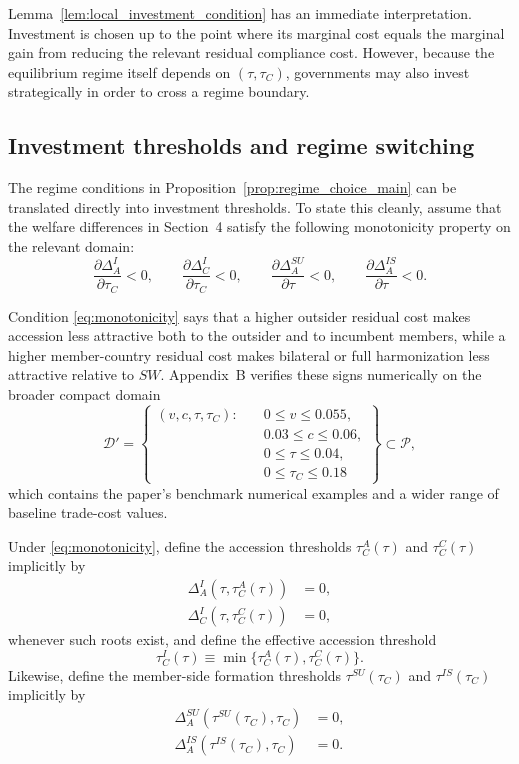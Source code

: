 Lemma~\ref{lem:local_investment_condition} has an immediate interpretation.
Investment is chosen up to the point where its marginal cost equals the
marginal gain from reducing the relevant residual compliance cost. However,
because the equilibrium regime itself depends on $(\tau,\tau_C)$, governments
may also invest strategically in order to cross a regime boundary.

\subsection{Investment thresholds and regime switching}

The regime conditions in Proposition~\ref{prop:regime_choice_main} can be
translated directly into investment thresholds. To state this cleanly, assume
that the welfare differences in Section~4 satisfy the following monotonicity
property on the relevant domain:
\begin{equation}
\frac{\partial \Delta_A^I}{\partial \tau_C}<0,
\qquad
\frac{\partial \Delta_C^I}{\partial \tau_C}<0,
\qquad
\frac{\partial \Delta_A^{SU}}{\partial \tau}<0,
\qquad
\frac{\partial \Delta_A^{IS}}{\partial \tau}<0.
\label{eq:monotonicity}
\end{equation}

Condition \eqref{eq:monotonicity} says that a higher outsider residual cost
makes accession less attractive both to the outsider and to incumbent members,
while a higher member-country residual cost makes bilateral or full
harmonization less attractive relative to $SW$. Appendix~B verifies these
signs numerically on the broader compact domain
\[
\mathcal D'
=
\left\{
\begin{aligned}
(v,c,\tau,\tau_C):\quad &0 \le v \le 0.055,\\
&0.03 \le c \le 0.06,\\
&0 \le \tau \le 0.04,\\
&0 \le \tau_C \le 0.18
\end{aligned}
\right\}
\subset \mathcal P,
\]
which contains the paper's benchmark numerical examples and a wider range of
baseline trade-cost values.

Under \eqref{eq:monotonicity}, define the accession thresholds
$\tau_C^A(\tau)$ and $\tau_C^C(\tau)$ implicitly by
\begin{align}
\Delta_A^I(\tau,\tau_C^A(\tau)) &= 0, \label{eq:tauCA_def}\\
\Delta_C^I(\tau,\tau_C^C(\tau)) &= 0, \label{eq:tauCC_def}
\end{align}
whenever such roots exist, and define the effective accession threshold
\begin{equation}
\tau_C^{I}(\tau)\equiv \min\{\tau_C^A(\tau),\tau_C^C(\tau)\}.
\label{eq:tauCI_def}
\end{equation}
Likewise, define the member-side formation thresholds $\tau^{SU}(\tau_C)$ and
$\tau^{IS}(\tau_C)$ implicitly by
\begin{align}
\Delta_A^{SU}(\tau^{SU}(\tau_C),\tau_C) &= 0, \label{eq:tauSU_def}\\
\Delta_A^{IS}(\tau^{IS}(\tau_C),\tau_C) &= 0. \label{eq:tauIS_def}
\end{align}

